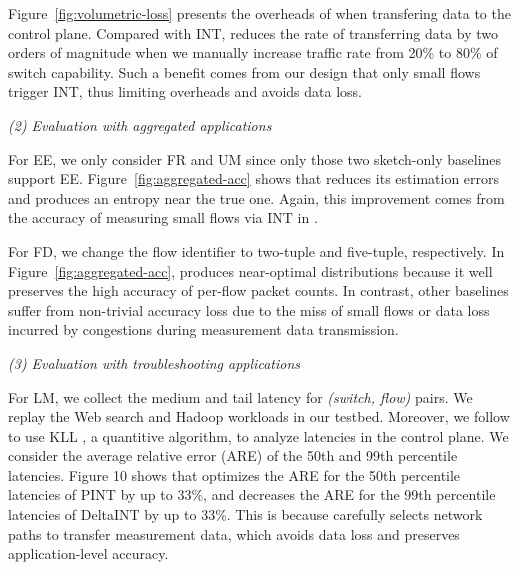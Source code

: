 
Figure~\ref{fig:volumetric-loss} presents the overheads of \sysname when transfering data to the control plane. Compared with INT, \sysname reduces the rate of transferring data by two orders of magnitude when we manually increase traffic rate from 20\% to 80\% of switch capability. Such a benefit comes from our design that only small flows trigger INT, thus limiting overheads and avoids data loss. 


\noindent \emph{(2) Evaluation with aggregated applications}

For EE, we only consider FR and UM since only those two sketch-only baselines support EE. Figure~\ref{fig:aggregated-acc} shows that \sysname reduces its estimation errors and produces an entropy near the true one. Again, this improvement comes from the accuracy of measuring small flows via INT in \sysname. 

For FD, we change the flow identifier to two-tuple and five-tuple, respectively. In Figure~\ref{fig:aggregated-acc}, \sysname produces near-optimal distributions because it well preserves the high accuracy of per-flow packet counts. In contrast, other baselines suffer from non-trivial accuracy loss due to the miss of small flows or data loss incurred by congestions during measurement data transmission. 

\noindent \emph{(3) Evaluation with troubleshooting applications}

For LM, we collect the medium and tail latency for \emph{(switch, flow)} pairs. We replay the Web search \cite{alizadeh2010data} and Hadoop workloads \cite{roy2015inside} in our testbed. Moreover, we follow \cite{ben2020pint} to use KLL \cite{karnin2016optimal}, a quantitive algorithm, to analyze latencies in the control plane. We consider the average relative error (ARE) of the 50th and 99th percentile latencies. Figure 10 shows that \sysname optimizes the ARE for the 50th percentile latencies of PINT by up to 33\%, and decreases the ARE for the 99th percentile latencies of DeltaINT by up to 33\%. This is because \sysname carefully selects network paths to transfer measurement data, which avoids data loss and preserves application-level accuracy.

